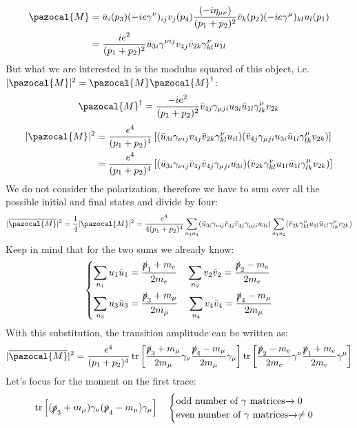 \documentclass[../main.tex]{subfiles}
\begin{document}
\begin{align*}
\pazocal{M}&=\bar{u}_i(p_3)(-ie\gamma^\nu)_{ij}v_j(p_4)\frac{(-i\eta_{\mu\nu})}{(p_1+p_2)^2}\bar{v}_k(p_2)(-ie\gamma^\mu)_{kl}u_l(p_1)\\
&=\frac{ie^2}{(p_1+p_2)^2}\bar{u}_{3i}\gamma^{\nu ij}v_{4j}\bar{v}_{2k}\gamma^\nu_{kl}u_{1l}
\end{align*}
But what we are interested in is the modulus squared of this object, i.e. $|\pazocal{M}|^2=\pazocal{M}\pazocal{M}^\dagger$:
\[
\pazocal{M}^\dagger=\frac{-ie^2}{(p_1+p_2)^2}\bar{v}_{4j}\gamma_{\mu ji}u_{3i}\bar{u}_{1l}\gamma^\mu_{lk}v_{2k}
\]
\begin{align*}
|\pazocal{M}|^2&=\frac{e^4}{(p_1+p_2)^4}\left[(\bar{u}_{3i}\gamma_{\nu ij}v_{4j}\bar{v}_{2k}\gamma^\nu_{kl}u_{il})(\bar{v}_{4j}\gamma_{\mu ji}u_{3i}\bar{u}_{1l}\gamma^\mu_{lk}v_{2k})\right]\\
&=\frac{e^4}{(p_1+p_2)^4}\left[(\bar{u}_{3i}\gamma_{\nu ij}\bar{v}_{4j}\bar{v}_{4j}\gamma_{\mu ji}u_{3i})(\bar{v}_{2k}\gamma^\nu_{kl}u_{1l}\bar{u}_{1l}\gamma^\mu_{lk}v_{2k})\right]
\end{align*}
We do not consider the polarization, therefore we have to sum over all the possible initial and final states and divide by four:
\[
|\overline{\pazocal{M}}|^2=\frac{1}{4}|\pazocal{M}|^2=\frac{e^4}{4(p_1+p_2)^4}\sum_{n_3n_4}(\bar{u}_{3i}\gamma_{\nu ij}\bar{v}_{4j}\bar{v}_{4j}\gamma_{\mu ji}u_{3i})\sum_{n_1n_2}(\bar{v}_{2k}\gamma^\nu_{kl}u_{1l}\bar{u}_{1l}\gamma^\mu_{lk}v_{2k})
\]
Keep in mind that for the two sums we already know:
\[
\left\{
\begin{aligned}
\sum_{n_1}u_1\bar{u}_1&=\frac{\slashed{p}_1+m_e}{2m_e} \quad \sum_{n_2}v_2\bar{v}_2=\frac{\slashed{p}_2-m_e}{2m_e}\\
\sum_{n_3}u_3\bar{u}_3&=\frac{\slashed{p}_3+m_\mu}{2m_\mu} \quad \sum_{n_4}v_4\bar{v}_4=\frac{\slashed{p}_4-m_\mu}{2m_\mu}
\end{aligned}
\right.
\]
With this substitution, the transition amplitude can be written as:
\[
|\overline{\pazocal{M}}|^2=\frac{e^4}{(p_1+p_2)^4}\tr\left[\frac{\slashed{p}_3+m_\mu}{2m_\mu}\gamma_\nu\frac{\slashed{p}_4-m_\mu}{2m_\mu}\gamma_\mu\right]\tr\left[\frac{\slashed{p}_2-m_e}{2m_e}\gamma^\nu\frac{\slashed{p}_1+m_e}{2m_e}\gamma^\mu\right]
\]
Let's focus for the moment on the first trace:
\[
\tr\left[(\slashed{p}_3+m_\mu)\gamma_\nu(\slashed{p}_4-m_\mu)\gamma_\mu\right]
\quad
\begin{cases}
\text{odd number of $\gamma$ matrices$\xrightarrow[]{}0$}\\
\text{even number of $\gamma$ matrices$\xrightarrow[]{}\neq0$}
\end{cases}
\]
\end{document}
